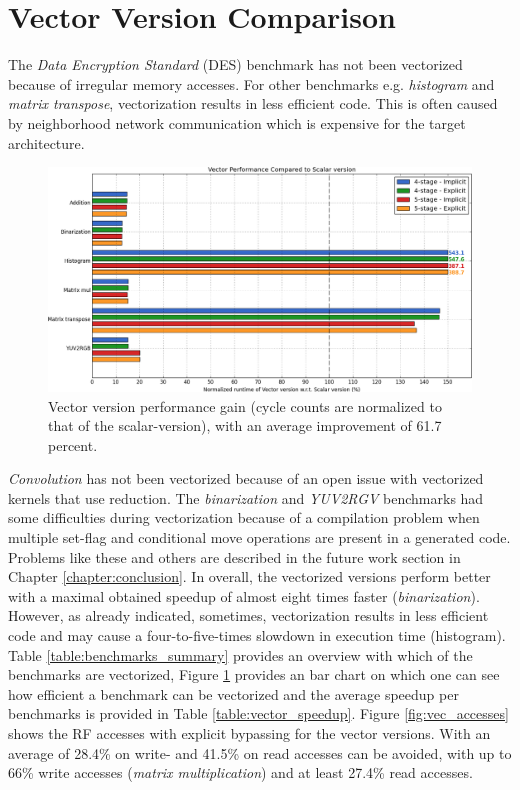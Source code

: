 \section{Vector Version Comparison}\label{sec:vector_version}
The \emph{Data Encryption Standard} (DES) benchmark has not been vectorized because of irregular memory accesses. For other benchmarks e.g. \emph{histogram} and \emph{matrix transpose}, vectorization results in less efficient code. This is often caused by neighborhood network communication which is expensive for the target architecture.

\begin{figure}[b!]
\centering
\hspace*{-.12in}
\includegraphics[width=.9\textwidth]{figures/stats/vector_cycles}
\caption{Vector version performance gain (cycle counts are normalized to that of the scalar-version), with an average improvement of 61.7 percent.}
\label{fig:vector_scalar_cmp}
\end{figure}

\emph{Convolution} has not been vectorized because of an open issue with vectorized kernels that use reduction. The \emph{binarization} and \emph{YUV2RGV} benchmarks had some difficulties during vectorization because of a compilation problem when multiple set-flag and conditional move operations are present in a generated code. Problems like these and others are described in the future work section in Chapter \ref{chapter:conclusion}. In overall, the vectorized versions perform better with a maximal obtained speedup of almost eight times faster (\emph{binarization}). However, as already indicated, sometimes, vectorization results in less efficient code and may cause a four-to-five-times slowdown in execution time (histogram). Table \ref{table:benchmarks_summary} provides an overview with which of the benchmarks are vectorized, Figure \ref{fig:vector_scalar_cmp} provides an bar chart on which one can see how efficient a benchmark can be vectorized and the average speedup per benchmarks is provided in Table \ref{table:vector_speedup}.  
Figure \ref{fig:vec_accesses} shows the RF accesses with explicit bypassing for the vector versions. With an average of 28.4\% on write- and 41.5\% on read accesses can be avoided, with up to 66\% write accesses (\emph{matrix multiplication}) and at least 27.4\% read accesses.

